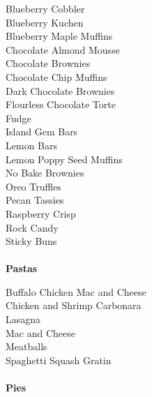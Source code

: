 \documentclass[11pt, twoside, openany]{book}
\begin{document}
Blueberry Cobbler\hrulefill\pageref{blueberry-cobbler}\\
Blueberry Kuchen\hrulefill\pageref{blueberry-kuchen}\\
Blueberry Maple Muffins\hrulefill\pageref{blueberry-maple-muffins}\\
Chocolate Almond Mousse\hrulefill\pageref{chocolate-almond-mousse}\\
Chocolate Brownies\hrulefill\pageref{chocolate-brownies}\\
Chocolate Chip Muffins\hrulefill\pageref{chocolate-chip-muffins}\\
Dark Chocolate Brownies\hrulefill\pageref{dark-chocolate-brownies}\\
Flourless Chocolate Torte\hrulefill\pageref{flourless-chocolate-torte}\\
Fudge\hrulefill\pageref{fudge}\\
Island Gem Bars\hrulefill\pageref{island-gem-bars}\\
Lemon Bars\hrulefill\pageref{lemon-bars}\\
Lemon Poppy Seed Muffins\hrulefill\pageref{lemon-poppy-seed-muffins}\\
No Bake Brownies\hrulefill\pageref{no-bake-brownies}\\
Oreo Truffles\hrulefill\pageref{oreo-truffles}\\
Pecan Tassies\hrulefill\pageref{pecan-tassies}\\
Raspberry Crisp\hrulefill\pageref{raspberry-crisp}\\
Rock Candy\hrulefill\pageref{rock-candy}\\
Sticky Buns\hrulefill\pageref{sticky-buns}\\
{~\vspace{2mm}\\ \Large \textbf{Pastas}}\hfill\textbf{\pageref{pastas}}

Buffalo Chicken Mac and Cheese\hrulefill\pageref{buffalo-chicken-mac-and-cheese}\\
Chicken and Shrimp Carbonara\hrulefill\pageref{chicken-and-shrimp-carbonara}\\
Lasagna\hrulefill\pageref{lasagna}\\
Mac and Cheese\hrulefill\pageref{mac-and-cheese}\\
Meatballs\hrulefill\pageref{meatballs}\\
Spaghetti Squash Gratin\hrulefill\pageref{spaghetti-squash-gratin}\\
{~\vspace{2mm}\\ \Large \textbf{Pies}}\hfill\textbf{\pageref{pies}}
\end{document}
